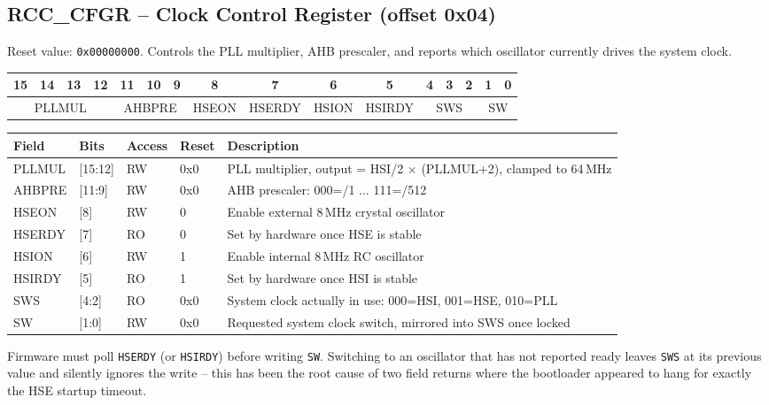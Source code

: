 \documentclass[11pt,a4paper,parskip=half]{scrartcl}
\begin{document}
\subsection{RCC\_CFGR -- Clock Control Register (offset 0x04)}

Reset value: \texttt{0x00000000}. Controls the PLL multiplier, AHB
prescaler, and reports which oscillator currently drives the system clock.

\begin{center}
\small
\begin{tabular}{|*{16}{c|}}
\hline
15 & 14 & 13 & 12 & 11 & 10 & 9 & 8 & 7 & 6 & 5 & 4 & 3 & 2 & 1 & 0 \\
\hline
\multicolumn{4}{c|}{PLLMUL} & \multicolumn{3}{c|}{AHBPRE} & HSEON & HSERDY & HSION & HSIRDY & \multicolumn{3}{c|}{SWS} & \multicolumn{2}{c|}{SW} \\
\hline
\end{tabular}
\end{center}

\begin{center}
\begin{tabularx}{\textwidth}{@{}l l l l Y@{}}
\toprule
\textbf{Field} & \textbf{Bits} & \textbf{Access} & \textbf{Reset} & \textbf{Description} \\
\midrule
PLLMUL & [15:12] & RW & 0x0 & PLL multiplier, output = HSI/2 $\times$ (PLLMUL+2), clamped to 64\,MHz \\
AHBPRE & [11:9] & RW & 0x0 & AHB prescaler: 000=/1 ... 111=/512 \\
HSEON & [8] & RW & 0 & Enable external 8\,MHz crystal oscillator \\
HSERDY & [7] & RO & 0 & Set by hardware once HSE is stable \\
HSION & [6] & RW & 1 & Enable internal 8\,MHz RC oscillator \\
HSIRDY & [5] & RO & 1 & Set by hardware once HSI is stable \\
SWS & [4:2] & RO & 0x0 & System clock actually in use: 000=HSI, 001=HSE, 010=PLL \\
SW & [1:0] & RW & 0x0 & Requested system clock switch, mirrored into SWS once locked \\
\bottomrule
\end{tabularx}
\end{center}

\begin{warnbox}
Firmware must poll \texttt{HSERDY} (or \texttt{HSIRDY}) before writing
\texttt{SW}. Switching to an oscillator that has not reported ready leaves
\texttt{SWS} at its previous value and silently ignores the write -- this
has been the root cause of two field returns where the bootloader appeared
to hang for exactly the HSE startup timeout.
\end{warnbox}
\end{document}
